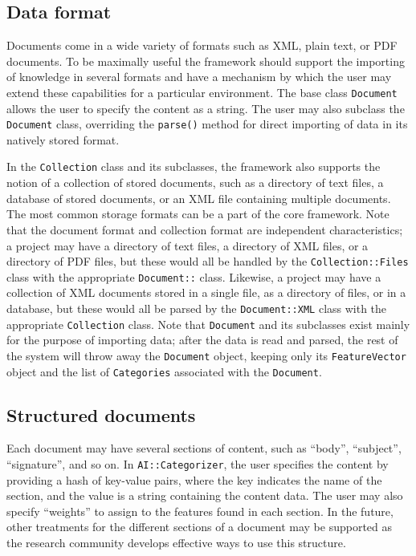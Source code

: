 \documentclass[a4paper,twocolumn]{article}
\begin{document}
\subsection{Data format}
Documents come in a wide variety of formats such as XML, plain text, or PDF documents.  To be maximally useful the framework should support the importing of knowledge in several formats and have a mechanism by which the user may extend these capabilities for a particular environment.  The base class \texttt{Document} allows the user to specify the content as a string.  The user may also subclass the \texttt{Document} class, overriding the \texttt{parse()} method for direct importing of data in its natively stored format.

In the \texttt{Collection} class and its subclasses, the framework also supports the notion of a collection of stored documents, such as a directory of text files, a database of stored documents, or an XML file containing multiple documents.  The most common storage formats can be a part of the core framework.  Note that the document format and collection format are independent characteristics; a project may have a directory of text files, a directory of XML files, or a directory of PDF files, but these would all be handled by the \texttt{Collection::Files} class with the appropriate \texttt{Document::} class.  Likewise, a project may have a collection of XML documents stored in a single file, as a directory of files, or in a database, but these would all be parsed by the \texttt{Document::XML} class with the appropriate \texttt{Collection} class. Note that \texttt{Document} and its subclasses exist mainly for the purpose of importing data; after the data is read and parsed, the rest of the system will throw away the \texttt{Document} object, keeping only its \texttt{FeatureVector} object and the list of \texttt{Categories} associated with the \texttt{Document}.

\subsection{Structured documents}
Each document may have several sections of content, such as ``body'', ``subject'', ``signature'', and so on.  In \texttt{AI::Categorizer}, the user specifies the content by providing a hash of key-value pairs, where the key indicates the name of the section, and the value is a string containing the content data.  The user may also specify ``weights'' to assign to the features found in each section.  In the future, other treatments for the different sections of a document may be supported as the research community develops effective ways to use this structure.
\end{document}
